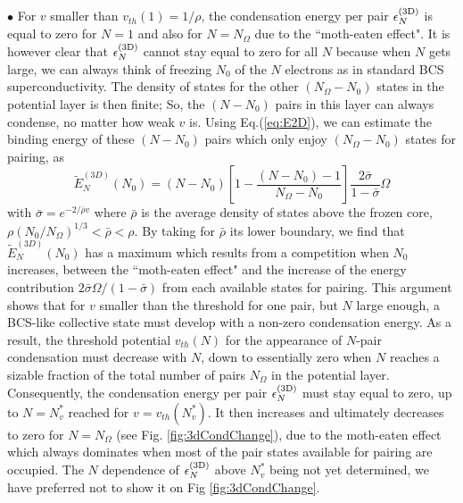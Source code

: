 \documentclass[5p,twocolumn]{elsarticle}
\begin{document}
$\bullet$ For $v$ smaller than $v_{th}(1)=1/\rho$, the condensation energy per pair $\epsilon_N^{{\text{(3D)}}}$ is equal to zero for $N=1$ and also for $N=N_\Omega$ due to the ``moth-eaten effect".  It is however clear that $\epsilon_N^{{\text{(3D)}}}$ cannot stay equal to zero for all $N$ because when $N$ gets large, we can always think of freezing $N_0$ of the $N$ electrons as in standard BCS superconductivity. The density of states for the other $(N_\Omega - N_0)$ states in the potential layer is then finite; So, the $(N-N_0)$ pairs in this layer can always condense, no matter how weak $v$ is.  Using Eq.(\ref{eq:E2D}),
 we can estimate the binding energy of these $(N-N_0)$ pairs which only enjoy $(N_\Omega - N_0)$ states for pairing, as
\begin{equation}\label{eq:E3D}
\widetilde{{E}}_N^{(3D)}(N_0)=(N-N_0)\left[1-\frac{(N-N_0)-1}{N_\Omega-N_0}\right]\frac{2\bar\sigma}{1-\bar\sigma}\Omega
\end{equation}
with $\bar{\sigma}=e^{-2/{\bar{\rho}v}}$ where $\bar\rho$ is the average density of states above the frozen core, $\rho(N_0/N_\Omega)^{ 1/3}<\bar\rho<\rho$. By taking for  $\bar\rho$ its lower boundary, we find that $\widetilde{{E}}_N^{(3D)}(N_0)$ has a maximum which results from a competition when $N_0$ increases, between the ``moth-eaten effect" and the increase of the energy contribution $2\bar\sigma\Omega/(1-\bar\sigma)$  from each available states for pairing.
This argument shows that for $v$ smaller than the threshold for one pair, but $N$ large enough, a BCS-like collective state must develop with a non-zero condensation energy. 
As a result, the threshold potential  $v_{th}(N)$ for the appearance of $N$-pair condensation  must decrease with $N$, down to essentially zero when $N$ reaches a sizable fraction of the total number of pairs $N_\Omega$ in the potential layer.  Consequently, the condensation energy per pair $\epsilon^{{{\text{(3D)}}}}_{N}$ must stay equal to zero, up to $N=N_v^*$ reached for $v=v_{th}(N_v^*)$. It then increases and ultimately decreases to zero for $N=N_\Omega$ (see Fig. \ref{fig:3dCondChange}), due to the moth-eaten effect which always dominates when most of the pair states available for pairing are occupied.  The $N$ dependence of $\epsilon_{N}^{{{\text{(3D)}}}}$ above $N_{v}^{*}$ being not yet determined, we have preferred not to show it on Fig \ref{fig:3dCondChange}. 
\end{document}
